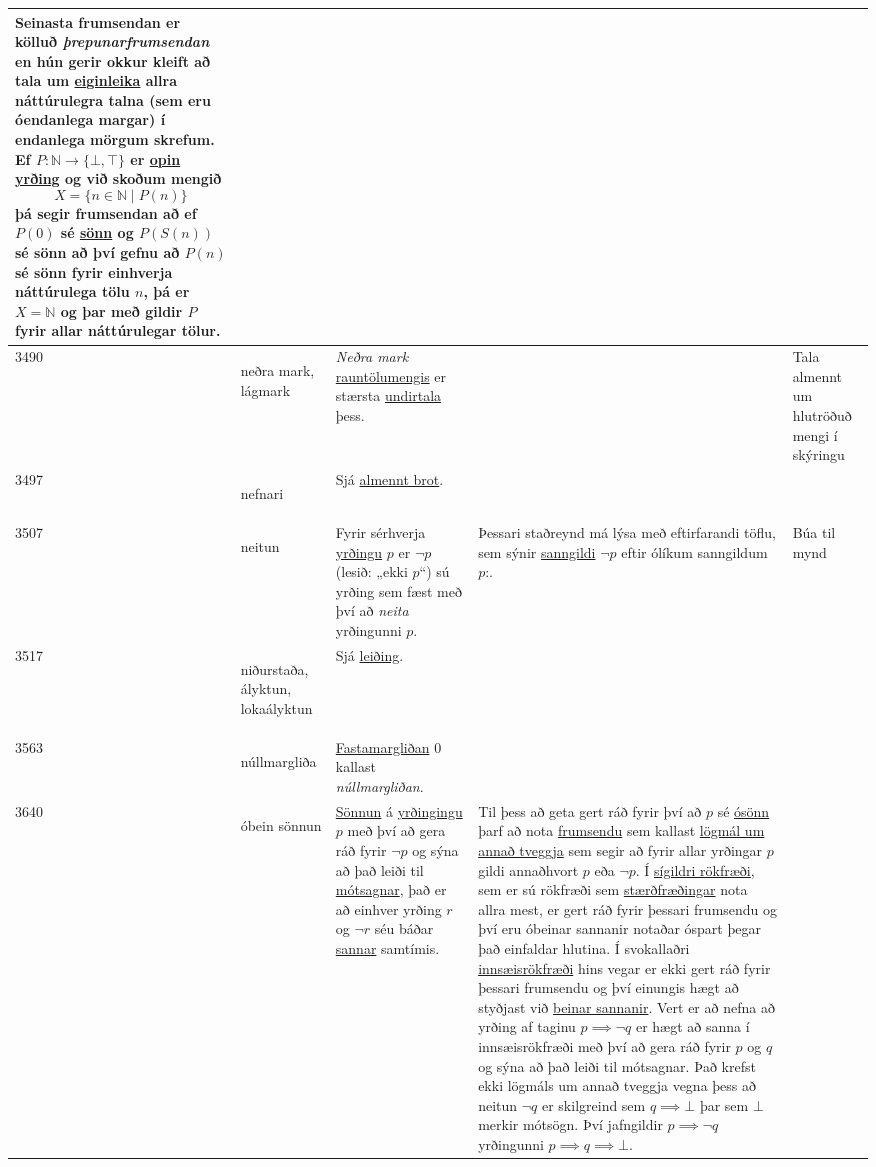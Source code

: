\begin{longtable}{p{} | p{} | p{} | p{} | p{}}
Seinasta frumsendan er kölluð \textit{þrepunarfrumsendan} en hún gerir okkur kleift að tala um \hyperlink{row:803}{eiginleika} allra náttúrulegra talna (sem eru óendanlega margar) í endanlega mörgum skrefum. Ef \(P : \mathbb{N} \to \{\bot,\top\}\) er \hyperlink{row:3800}{opin yrðing} og við skoðum mengið \[ X = \{ n \in \mathbb{N} \mid P(n)\} \] þá segir frumsendan að ef \(P(0)\) sé \hyperlink{row:6659}{sönn} og \(P(S(n))\) sé sönn að því gefnu að \(P(n)\) sé sönn fyrir einhverja náttúrulega tölu \(n\), þá er \(X = \mathbb{N}\) og þar með gildir \(P\) fyrir allar náttúrulegar tölur. &  \\
\hline
3490 & \hypertarget{row:3490}{neðra mark, lágmark} & \textit{Neðra mark} \hyperlink{row:4093}{rauntölu}\hyperlink{row:3270}{mengis} er stærsta \hyperlink{row:5818}{undirtala} þess. &  & Tala almennt um hlutröðuð mengi í skýringu \\
\hline
3497 & \hypertarget{row:3497}{nefnari} & Sjá \hyperlink{row:234}{almennt brot}. &  &  \\
\hline
3507 & \hypertarget{row:3507}{neitun} & Fyrir sérhverja \hyperlink{row:1515}{yrðingu} \(p\) er \(\neg p\) (lesið: „ekki \(p\)“) sú yrðing sem fæst með því að \textit{neita} yrðingunni \(p\). & Þessari staðreynd má lýsa með eftirfarandi töflu, sem sýnir \hyperlink{row:4560}{sanngildi} \(\neg p\) eftir ólíkum sanngildum \(p\):. & Búa til mynd \\
\hline
3517 & \hypertarget{row:3517}{niðurstaða, ályktun, lokaályktun} & Sjá \hyperlink{row:2836}{leiðing}. &  &  \\
\hline
3563 & \hypertarget{row:3563}{núllmargliða} & \hyperlink{row:0}{Fastamargliðan} 0 kallast \textit{núllmargliðan}. &  &  \\
\hline
3640 & \hypertarget{row:3640}{óbein sönnun} & \hyperlink{row:4964}{Sönnun} á \hyperlink{row:1515}{yrðingingu} \(p\) með því að gera ráð fyrir \(\lnot p\) og sýna að það leiði til \hyperlink{row:3403}{mótsagnar}, það er að einhver yrðing \(r\) og \(\lnot r\) séu báðar \hyperlink{row:6659}{sannar} samtímis. & Til þess að geta gert ráð fyrir því að \(p\) sé \hyperlink{row:6624}{ósönn} þarf að nota \hyperlink{row:1452}{frumsendu} sem kallast \hyperlink{row:2987}{lögmál um annað tveggja} sem segir að fyrir allar yrðingar \(p\) gildi annaðhvort \(p\) eða \(\lnot p\). Í \hyperlink{row:4642}{sígildri rökfræði}, sem er sú rökfræði sem \hyperlink{row:5117}{stærðfræðingar} nota allra mest, er gert ráð fyrir þessari frumsendu og því eru óbeinar sannanir notaðar óspart þegar það einfaldar hlutina. Í svokallaðri \hyperlink{row:2422}{innsæisrökfræði} hins vegar er ekki gert ráð fyrir þessari frumsendu og því einungis hægt að styðjast við \hyperlink{row:425}{beinar sannanir}. Vert er að nefna að yrðing af taginu \(p \implies \lnot q\) er hægt að sanna í innsæisrökfræði með því að gera ráð fyrir \(p\) og \(q\) og sýna að það leiði til mótsagnar. Það krefst ekki lögmáls um annað tveggja vegna þess að neitun \(\lnot q\) er skilgreind sem \(q \implies \bot\) þar sem \(\bot\) merkir mótsögn. Því jafngildir \(p \implies \lnot q\) yrðingunni \(p \implies q \implies \bot\). &  \\

\end{longtable}
